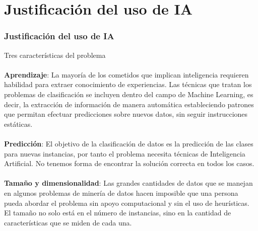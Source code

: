 \documentclass[8pt]{beamer}
\begin{document}
\section{Justificación del uso de IA}
  \begin{frame}
    \frametitle{Justificación del uso de IA}
      {\Large Tres características del problema}
      \\~\\
      
      \textbf{Aprendizaje}: La mayoría de los cometidos que implican inteligencia requieren habilidad
      para extraer conocimiento de experiencias. Las técnicas que tratan los problemas 
      de clasificación se incluyen dentro del campo de Machine Learning,
      es decir, la extracción de información de manera automática estableciendo patrones
      que permitan efectuar predicciones sobre nuevos datos, sin seguir instrucciones 
      estáticas. 
      \\~\\
      
      \textbf{Predicción}: El objetivo de la clasificación de datos es la predicción de las
      clases para nuevas instancias, por tanto el problema necesita técnicas de Inteligencia 
      Artificial. No tenemos forma de encontrar la solución correcta en todos los casos.
      \\~\\
      
      \textbf{Tamaño y dimensionalidad}: Las grandes cantidades de datos que se manejan en algunos problemas
      de minería de datos hacen imposible que una persona pueda abordar el problema
      sin apoyo computacional y sin el uso de heurísticas. El tamaño no solo está en el número
      de instancias, sino en la cantidad de características que se miden de cada una.
  \end{frame}
\end{document}
